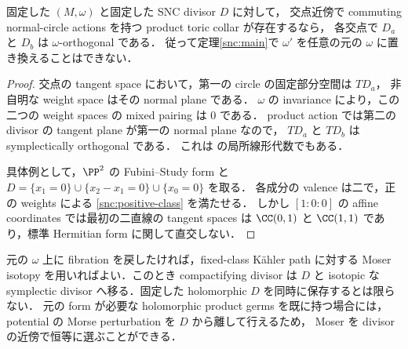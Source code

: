 \begin{proposition}
\label{snc:orthogonality}
固定した $(M,\omega)$ と固定した SNC divisor $D$ に対して，
交点近傍で commuting normal-circle actions を持つ product toric collar が存在するなら，
各交点で $D_a$ と $D_b$ は $\omega$-orthogonal である．
従って定理\ref{snc:main}で $\omega'$ を任意の元の $\omega$ に置き換えることはできない．
\end{proposition}
\begin{proof}
交点の tangent space において，第一の circle の固定部分空間は $TD_a$，
非自明な weight space はその normal plane である．
$\omega$ の invariance により，この二つの weight spaces の mixed pairing は $0$ である．
product action では第二の divisor の tangent plane が第一の normal plane なので，
$TD_a$ と $TD_b$ は symplectically orthogonal である．
これは \cite[Proposition 2.5]{BSV} の局所線形代数でもある．

具体例として，$\PP^2$ の Fubini--Study form と
$D=\{x_1=0\}\cup\{x_2-x_1=0\}\cup\{x_0=0\}$ を取る．
各成分の valence は二で，正の weights による \eqref{snc:positive-class} を満たせる．
しかし $[1:0:0]$ の affine coordinates では最初の二直線の tangent spaces は
$\CC(0,1)$ と $\CC(1,1)$ であり，標準 Hermitian form に関して直交しない．
\end{proof}

元の $\omega$ 上に fibration を戻したければ，fixed-class Kähler path に対する
Moser isotopy を用いればよい．このとき compactifying divisor は $D$ と isotopic な
symplectic divisor へ移る．固定した holomorphic $D$ を同時に保存するとは限らない．
元の form が必要な holomorphic product germs を既に持つ場合には，
potential の Morse perturbation を $D$ から離して行えるため，
Moser を divisor の近傍で恒等に選ぶことができる．


